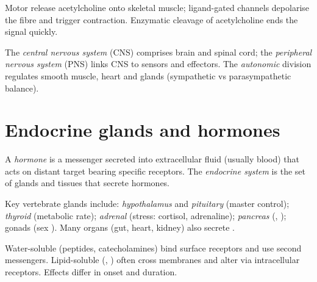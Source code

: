 \begin{example}
\label{ex:g12:nerves-hormones:nmj}
Motor  release acetylcholine onto skeletal muscle; ligand-gated
channels depolarise the fibre and trigger contraction. Enzymatic
cleavage of acetylcholine ends the signal quickly.
\end{example}

\begin{definition}
\label{def:g12:nerves-hormones:cns}
The \emph{central nervous system} (CNS)
comprises brain and spinal cord; the \emph{peripheral nervous system}
 (PNS) links CNS to sensors and
effectors. The \emph{autonomic} division
regulates smooth muscle, heart and glands (sympathetic vs parasympathetic
balance).
\end{definition}

\section{Endocrine glands and hormones}

\begin{definition}[Hormone]\label{def:g12:nerves-hormones:hormone}
A \emph{hormone} is a  messenger secreted into
extracellular fluid (usually blood) that acts on distant target 
bearing specific receptors. The \emph{endocrine system} is the set of glands and tissues that secrete hormones.
\end{definition}

\begin{definition}
\label{def:g12:nerves-hormones:glands}
Key vertebrate glands include: \emph{hypothalamus}
and \emph{pituitary} (master control); \emph{thyroid}
 (metabolic rate); \emph{adrenal}
(stress: cortisol, adrenaline); \emph{pancreas}
(, ); gonads (sex ). Many organs (gut, heart,
kidney) also secrete .
\end{definition}

\begin{proposition}
\label{prop:g12:nerves-hormones:classes}
Water-soluble  (peptides, catecholamines) bind surface receptors
and use second messengers. Lipid-soluble  (, 
) often cross membranes and alter   via
intracellular receptors. Effects differ in onset and duration.
\end{proposition}
\admitted


